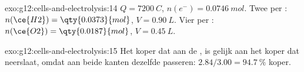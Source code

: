 \begin{solution}{exo:g12:cells-and-electrolysis:14}
$Q = \qty{7200}{C}$, $n(e^-) = \qty{0.0746}{mol}$. Twee  per
: $n(\ce{H2}) = \qty{0.0373}{mol}$, $V = \qty{0.90}{L}$. Vier per
: $n(\ce{O2}) = \qty{0.0187}{mol}$, $V = \qty{0.45}{L}$.
\end{solution}

\begin{solution}{exo:g12:cells-and-electrolysis:15}
Het koper dat aan de  , is gelijk aan het koper dat neerslaat,
omdat aan beide kanten dezelfde  passeren:
$2.84/3.00 = \qty{94.7}{\percent}$ koper.
\end{solution}

